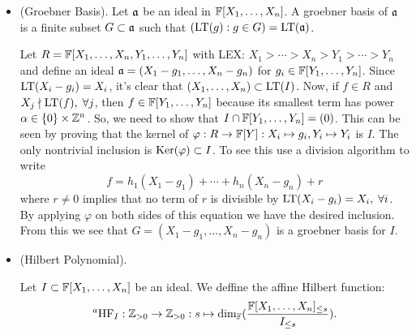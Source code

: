 \begin{itemize}
    \item(Groebner Basis). Let $\mathfrak{a}$ be an ideal in $\mathbb{F}[X_1,\dots, X_n]$. A groebner basis of $\mathfrak{a}$ 
    is a finite subset $G\subset\mathfrak{a}$ such that $(\text{LT}(g):g\in G) = \text{LT}(\mathfrak{a})$.\par 
    
    \begin{example}
        Let $R=\mathbb{F}[X_1,\dots, X_n, Y_1,\dots, Y_n]$ with LEX: $X_1>\cdots>X_n>Y_1>\cdots>Y_n$ and define an ideal 
    $\mathfrak{a} = (X_1 - g_1,\dots, X_n - g_n)$ for $g_i\in\mathbb{F}[Y_1,\dots, Y_n]$. Since 
    $\text{LT}(X_i - g_i)=X_i$, it's clear that $(X_1,\dots, X_n)\subset \text{LT}(I)$. Now, if $f\in R$ and 
    $X_j\nmid \text{LT}(f),\;\forall j$, then $f\in \mathbb{F}[Y_1,\dots, Y_n]$ because its smallest term has 
    power $\alpha \in \{0\}\times\mathbb{Z}^n$. So, we need to show that $I\cap \mathbb{F}[Y_1,\dots, Y_n] = (0)$. This can be seen 
    by proving that the kernel of $\varphi: R\to \mathbb{F}[Y]:X_i\mapsto g_i, Y_i\mapsto Y_i$ is $I$. The only nontrivial inclusion 
    is $\text{Ker}(\varphi)\subset I$. To see this use a division algorithm to write 
    \begin{equation}
        f = h_1(X_1-g_1)+\cdots + h_n(X_n-g_n) + r
    \end{equation}
     where $r\neq0$ implies that no term of $r$ is divisible by $\text{LT}(X_i - g_i) = X_i,\;\forall i$. By applying 
     $\varphi$ on both sides of this equation we have the desired inclusion. From this we see that 
     $G = (X_1-g_1,\dots, X_n-g_n)$ is a groebner basis for $I$.
    \end{example}
    \item(Hilbert Polynomial). 
    \begin{definition}
        Let $I\subset \mathbb{F}[X_1,\dots, X_n]$ be an ideal. We deffine the affine Hilbert function:
        \begin{equation}
            \prescript{a}{}{}\text{HF}_I:\mathbb{Z}_{>0}\to\mathbb{Z}_{>0}:s\mapsto \dim_{\mathbb{F}}(\frac{\mathbb{F}[X_1,\dots,X_n]_{\leq s}}{I_{\leq s}}).
        \end{equation}
    \end{definition}


\end{itemize}
